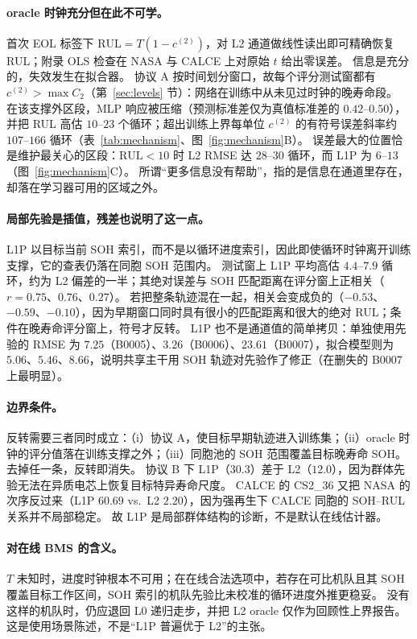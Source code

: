 \documentclass[UTF8,a4paper,12pt]{ctexart}
\begin{document}
\paragraph{oracle 时钟充分但在此不可学。}
首次 EOL 标签下 $\mathrm{RUL}=T(1-c^{(2)})$，对 L2 通道做线性读出即可精确恢复 RUL；附录 OLS 检查在 NASA 与 CALCE 上对原始 $t$ 给出零误差。
信息是充分的，失效发生在拟合器。
协议 A 按时间划分窗口，故每个评分测试窗都有 $c^{(2)}>\max C_2$（第~\ref{sec:levels} 节）：网络在训练中从未见过时钟的晚寿命段。
在该支撑外区段，MLP 响应被压缩（预测标准差仅为真值标准差的 $0.42$--$0.50$），并把 RUL 高估 $10$--$23$ 个循环；超出训练上界每单位 $c^{(2)}$ 的有符号误差斜率约 $107$--$166$ 循环（表~\ref{tab:mechanism}、图~\ref{fig:mechanism}B）。
误差最大的位置恰是维护最关心的区段：$\mathrm{RUL}<10$ 时 L2 RMSE 达 $28$--$30$ 循环，而 L1P 为 $6$--$13$（图~\ref{fig:mechanism}C）。
所谓“更多信息没有帮助”，指的是信息在通道里存在，却落在学习器可用的区域之外。

\paragraph{局部先验是插值，残差也说明了这一点。}
L1P 以目标当前 SOH 索引，而不是以循环进度索引，因此即使循环时钟离开训练支撑，它的查表仍落在同胞 SOH 范围内。
测试窗上 L1P 平均高估 $4.4$--$7.9$ 循环，约为 L2 偏差的一半；其绝对误差与 SOH 匹配距离在评分窗上正相关（$r=0.75$、$0.76$、$0.27$）。
若把整条轨迹混在一起，相关会变成负的（$-0.53$、$-0.59$、$-0.10$），因为早期窗口同时具有很小的匹配距离和很大的绝对 RUL；条件在晚寿命评分窗上，符号才反转。
L1P 也不是通道值的简单拷贝：单独使用先验的 RMSE 为 $7.25$（B0005）、$3.26$（B0006）、$23.61$（B0007），拟合模型则为 $5.06$、$5.46$、$8.66$，说明共享主干用 SOH 轨迹对先验作了修正（在删失的 B0007 上最明显）。

\paragraph{边界条件。}
反转需要三者同时成立：（i）协议 A，使目标早期轨迹进入训练集；（ii）oracle 时钟的评分值落在训练支撑之外；（iii）同胞池的 SOH 范围覆盖目标晚寿命 SOH。
去掉任一条，反转即消失。
协议 B 下 L1P（$30.3$）差于 L2（$12.0$），因为群体先验无法在异质电芯上恢复目标特异寿命尺度。
CALCE 的 CS2\_36 又把 NASA 的次序反过来（L1P $60.69$ vs.\ L2 $2.20$），因为强再生下 CALCE 同胞的 SOH--RUL 关系并不局部稳定。
故 L1P 是局部群体结构的诊断，不是默认在线估计器。

\paragraph{对在线 BMS 的含义。}
$T$ 未知时，进度时钟根本不可用；在在线合法选项中，若存在可比机队且其 SOH 覆盖目标工作区间，SOH 索引的机队先验比未校准的循环进度外推更稳妥。
没有这样的机队时，仍应退回 L0 递归走步，并把 L2 oracle 仅作为回顾性上界报告。
这是使用场景陈述，不是“L1P 普遍优于 L2”的主张。
\end{document}
